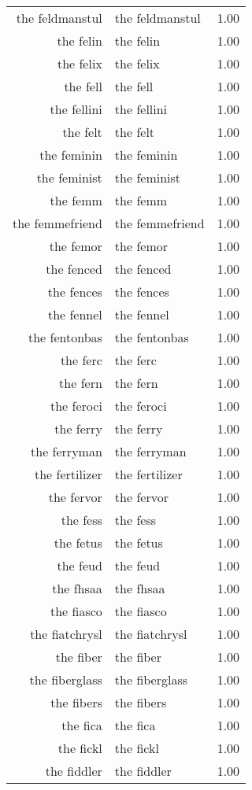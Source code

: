 \begin{table}[ht]
\begin{tabular}{rlr}
  the feldmanstul & the feldmanstul & 1.00 \\ 
  the felin & the felin & 1.00 \\ 
  the felix & the felix & 1.00 \\ 
  the fell & the fell & 1.00 \\ 
  the fellini & the fellini & 1.00 \\ 
  the felt & the felt & 1.00 \\ 
  the feminin & the feminin & 1.00 \\ 
  the feminist & the feminist & 1.00 \\ 
  the femm & the femm & 1.00 \\ 
  the femmefriend & the femmefriend & 1.00 \\ 
  the femor & the femor & 1.00 \\ 
  the fenced & the fenced & 1.00 \\ 
  the fences & the fences & 1.00 \\ 
  the fennel & the fennel & 1.00 \\ 
  the fentonbas & the fentonbas & 1.00 \\ 
  the ferc & the ferc & 1.00 \\ 
  the fern & the fern & 1.00 \\ 
  the feroci & the feroci & 1.00 \\ 
  the ferry & the ferry & 1.00 \\ 
  the ferryman & the ferryman & 1.00 \\ 
  the fertilizer & the fertilizer & 1.00 \\ 
  the fervor & the fervor & 1.00 \\ 
  the fess & the fess & 1.00 \\ 
  the fetus & the fetus & 1.00 \\ 
  the feud & the feud & 1.00 \\ 
  the fhsaa & the fhsaa & 1.00 \\ 
  the fiasco & the fiasco & 1.00 \\ 
  the fiatchrysl & the fiatchrysl & 1.00 \\ 
  the fiber & the fiber & 1.00 \\ 
  the fiberglass & the fiberglass & 1.00 \\ 
  the fibers & the fibers & 1.00 \\ 
  the fica & the fica & 1.00 \\ 
  the fickl & the fickl & 1.00 \\ 
  the fiddler & the fiddler & 1.00 \\ 

\end{tabular}
\end{table}
